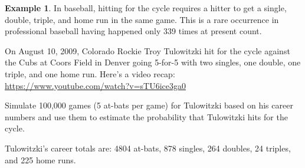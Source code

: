\documentclass[
  11pt,
]{book}
\newenvironment{Shaded}{\begin{snugshade}}{\end{snugshade}}
\newcommand{\AttributeTok}[1]{\textcolor[rgb]{0.77,0.63,0.00}{#1}}
\newcommand{\CommentTok}[1]{\textcolor[rgb]{0.56,0.35,0.01}{\textit{#1}}}
\newcommand{\ControlFlowTok}[1]{\textcolor[rgb]{0.13,0.29,0.53}{\textbf{#1}}}
\newcommand{\DecValTok}[1]{\textcolor[rgb]{0.00,0.00,0.81}{#1}}
\newcommand{\FunctionTok}[1]{\textcolor[rgb]{0.00,0.00,0.00}{#1}}
\newcommand{\NormalTok}[1]{#1}
\newcommand{\OtherTok}[1]{\textcolor[rgb]{0.56,0.35,0.01}{#1}}
\newcommand{\SpecialCharTok}[1]{\textcolor[rgb]{0.00,0.00,0.00}{#1}}
\theoremstyle{definition}
\theoremstyle{definition}
\newtheorem{example}{Example}[chapter]
\theoremstyle{definition}
\theoremstyle{definition}
\theoremstyle{remark}
\begin{document}
\newpage

\begin{example}
In baseball, hitting for the cycle requires a hitter to get a single, double, triple, and home run in the same game. This is a rare occurrence in professional baseball having happened only 339 times at present count.

On August 10, 2009, Colorado Rockie Troy Tulowitzki hit for the cycle against the Cubs at Coors Field in Denver going 5-for-5 with two singles, one double, one triple, and one home run. Here's a video recap: \url{https://www.youtube.com/watch?v=sTU6ice3ga0}

Simulate 100,000 games (5 at-bats per game) for Tulowitzki based on his career numbers and use them to estimate the probability that Tulowitzki hits for the cycle.

Tulowitzki's career totals are: 4804 at-bats, 878 singles, 264 doubles, 24 triples, and 225 home runs.
\end{example}

\begin{Shaded}
\end{Shaded}
\end{document}

